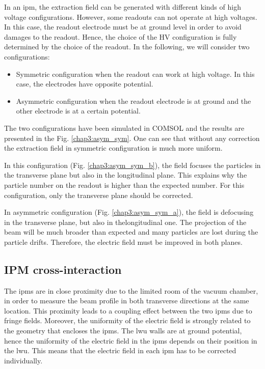 \begin{refsection}
  In an \acrshort{ipm}, the extraction field can be generated with different kinds of high voltage configurations. However, some readouts can not operate at high voltages. In this case, the readout electrode must be at ground level in order to avoid damages to the readout. Hence, the choice of the HV configuration is fully determined by the choice of the readout. In the following, we will consider two configurations:
  \begin{itemize}
    \item Symmetric configuration when the readout can work at high voltage. In this case, the electrodes have opposite potential.
    \item Asymmetric configuration when the readout electrode is at ground and the other electrode is at a certain potential.
  \end{itemize}

  The two configurations have been simulated in COMSOL and the results are presented in the Fig. \ref{chap3:asym_sym}. One can see that without any correction the extraction field in symmetric configuration is much more uniform.
  

  In this configuration (Fig. \ref{chap3:asym_sym_b}), the field focuses the particles in the transverse plane but also in the longitudinal plane. This explains why the particle number on the readout is higher than the expected number. For this configuration, only the transverse plane should be corrected.

  In asymmetric configuration (Fig. \ref{chap3:asym_sym_a}), the field is defocusing in the transverse plane, but also in thelongitudinal one. The projection of the beam will be much broader than expected and many particles are lost during the particle drifts. Therefore, the electric field must be improved in both planes.


  \subsection{IPM cross-interaction}

  The \acrshort{ipm}s are in close proximity due to the limited room of the vacuum chamber, in order to measure the beam profile in both transverse directions at the same location. This proximity leads to a coupling effect between the two \acrshort{ipm}s due to fringe fields. Moreover, the uniformity of the electric field is strongly related to the geometry that encloses the \acrshort{ipm}s. The \acrshort{lwu} walls are at ground potential, hence the uniformity of the electric field in the \acrshort{ipm}s depends on their position in the \acrshort{lwu}. This means that the electric field in each \acrshort{ipm} has to be corrected individually.


\end{refsection}
